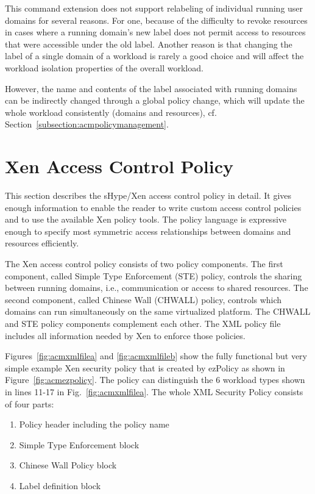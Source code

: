 \documentclass[11pt,twoside,final,openright]{report}
\begin{document}
This command extension does not support relabeling of individual running user domains
for several reasons. For one, because of the difficulty to revoke resources
in cases where a running domain's new label does not permit access to resources
that were accessible under the old label. Another reason is that changing the
label of a single domain of a workload is rarely a good choice and will affect
the workload isolation properties of the overall workload.

However, the name and contents of the label associated with running domains can
be indirectly changed through a global policy change, which will update the whole
workload consistently (domains and resources), cf.
Section~\ref{subsection:acmpolicymanagement}.

\section{Xen Access Control Policy}
\label{section:acmpolicy}

This section describes the sHype/Xen access control policy in detail.
It gives enough information to enable the reader to write custom
access control policies and to use the available Xen policy tools. The
policy language is expressive enough to specify most symmetric access
relationships between domains and resources efficiently.

The Xen access control policy consists of two policy components.  The
first component, called Simple Type Enforcement (STE) policy, controls
the sharing between running domains, i.e., communication or access to
shared resources. The second component, called Chinese Wall (CHWALL)
policy, controls which domains can run simultaneously on the same
virtualized platform. The CHWALL and STE policy components complement
each other. The XML policy file includes all information
needed by Xen to enforce those policies.

Figures~\ref{fig:acmxmlfilea} and \ref{fig:acmxmlfileb} show the fully
functional but very simple example Xen security policy that is created
by ezPolicy as shown in Figure~\ref{fig:acmezpolicy}. The policy can
distinguish the 6 workload types shown in lines 11-17 in
Fig.~\ref{fig:acmxmlfilea}. The whole XML Security Policy consists of
four parts:
\begin{enumerate}
\item Policy header including the policy name
\item Simple Type Enforcement block
\item Chinese Wall Policy block
\item Label definition block
\end{enumerate}
\end{document}
